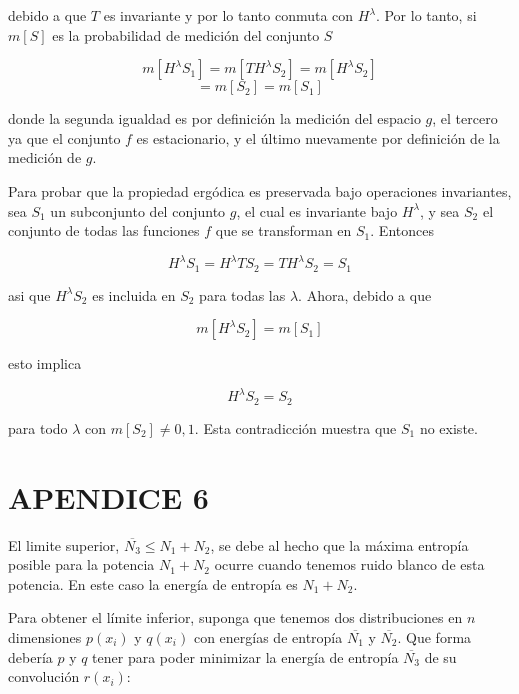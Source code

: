 debido a que $T$ es invariante y por lo tanto conmuta con $H^{\lambda}$. Por lo tanto, si
$m[S]$ es la probabilidad de medici\'on del conjunto $S$

\begin{equation} m[H^{\lambda} S_{1}] = m[T H^{\lambda} S_{2}] = m[H^{\lambda} S_{2}] \end{equation}
\begin{equation} = m[S_{2}] = m[S_{1}]\end{equation}
								
donde la segunda igualdad es por definici\'on la medici\'on del espacio $g$, el tercero ya que
el conjunto $f$ es estacionario, y el \'ultimo nuevamente por definici\'on de la medici\'on de $g$.

Para probar que la propiedad ergódica es preservada bajo operaciones invariantes, sea $S_{1}$
un subconjunto del conjunto $g$, el cual es invariante bajo $H^{\lambda}$, y sea $S_{2}$ el conjunto
de todas las funciones $f$ que se transforman en $S_{1}$. Entonces

\begin{equation} H^{\lambda} S_{1} = H^{\lambda} T S_{2} = T H^{\lambda} S_{2} = S_{1} \end{equation}
				
asi que $H^{\lambda} S_{2}$ es incluida en $S_{2}$ para todas las $\lambda$. Ahora, debido a que
			
\begin{equation} m[H^{\lambda} S_{2}] = m[S_{1}] \end{equation}
				
esto implica

\begin{equation} H^{\lambda} S_{2} = S_{2} \end{equation}

para todo $\lambda$ con $m[S_{2}] \neq 0, 1$. Esta contradicci\'on muestra que $S_{1}$ no existe.


\section{APENDICE 6}

El limite superior, $\overline{N_{3}} \leq N_{1} + N_{2}$, se debe al hecho que la m\'axima entrop\'ia posible 
para la potencia $N_{1} + N_{2}$ ocurre cuando tenemos ruido blanco de esta potencia. En este caso la
energ\'ia de entrop\'ia es $N_{1} + N_{2}$.

Para obtener el l\'imite inferior, suponga que tenemos dos distribuciones en $n$ dimensiones
$p(x_{i})$ y $q(x_{i})$ con energ\'ias de entrop\'ia $\overline{N_{1}}$ y $\overline{N_{2}}$. Que forma deber\'ia 
$p$ y $q$ tener para poder minimizar la energ\'ia de entrop\'ia $\overline{N_{3}}$ de su convoluci\'on $r(x_{i})$:

